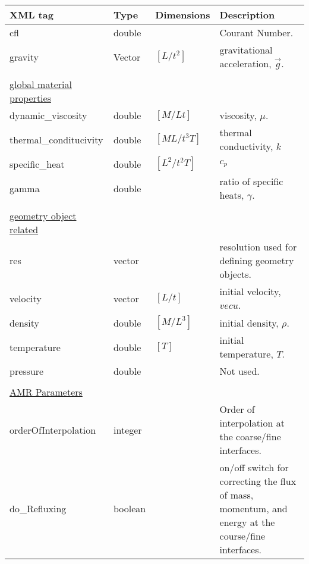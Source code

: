 \documentclass[fleqn,10pt]{article}
\begin{document}
\begin {center}
\begin{tabular}{lllp{8cm}}
\\
\small{XML tag} & \small{Type} & \small{Dimensions} & \small{Description}\\
\hline
\hline
cfl                   & double &               &    Courant Number.\\
gravity               & Vector & $[L/t^2]$     &    gravitational acceleration, $\vec{g}$.\\
\\
\underline{\small{global material properties}} & & &\\
dynamic\_viscosity    & double & $[M/Lt]$      &    viscosity, $\mu$.\\
thermal\_conditucivity& double & $[ML/t^3T]$   &    thermal conductivity, $k$\\
specific\_heat        & double & $ [L^2/t^2 T]$ &   $c_p$\\
gamma                 & double &               &    ratio of specific heats, $\gamma$.\\
\\
\underline{\small{geometry object related}} & & &\\
res                   & vector &               &    resolution used for defining geometry objects.\\
velocity              & vector & $[L/t]$       &    initial velocity, $vec{u}$.\\
density               & double & $[M/L^3]$     &    initial density, $\rho$.\\
temperature           & double & $[T]$         &    initial temperature, $T$.\\
pressure              & double &               &    Not used. \\
\\
\underline{\small{AMR Parameters}} & & & \\
orderOfInterpolation  & integer &              &    Order of interpolation at the coarse/fine interfaces. \\
do\_Refluxing         & boolean &              &    on/off switch for correcting the flux of mass, momentum, and energy at the
                                                    course/fine interfaces.\\
\hline
\end{tabular}
\end{center}
\end{document}
